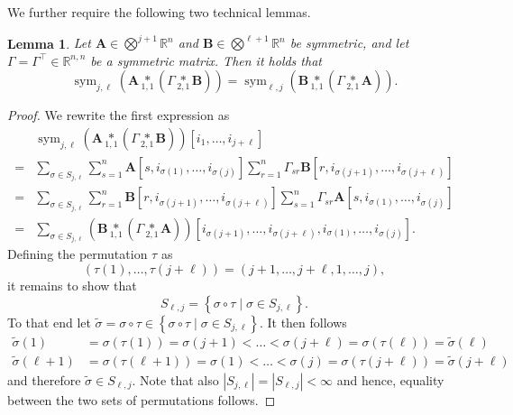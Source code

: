 \documentclass[11pt,reqno]{amsart}
\numberwithin{equation}{section}
\theoremstyle{plain}
\newtheorem{lemma}{Lemma}
\newcommand{\R}{\mathbb{R}}
\DeclareMathOperator{\Sym}{sym}
\newcommand{\tenp}[2]{\underset{#1,#2}{*}}
\begin{document}
We further require the following two technical lemmas. 
\begin{lemma}\label{LEM:HigherDerivativesCalculations}
  Let $\mathbf{A}\in \bigotimes^{j+1}\R^n$ and $\mathbf{B}\in \bigotimes^{\ell+1}\R^n$ be symmetric, and let $\Gamma=\Gamma^\top \in\R^{n,n}$ be a symmetric matrix. Then it holds that
      \begin{equation}\label{EQ:SymmetrieHJBValueFuncTerms}
        \Sym_{j,\ell}\left(\mathbf{A} \tenp{1}{1}\left(\Gamma\tenp{2}{1} \mathbf{B}\right)\right) = \Sym_{\ell,j}\left(\mathbf{B} \tenp{1}{1}\left(\Gamma\tenp{2}{1} \mathbf{A}\right)\right).
      \end{equation}
\end{lemma}
\begin{proof}
  We rewrite the first expression as
  \begin{align*}
    &\Sym_{j,\ell}\left(\mathbf{A} \tenp{1}{1}\left(\Gamma\tenp{2}{1} \mathbf{B}\right)\right)[i_1,\dots,i_{j+\ell}]\\ =& \sum_{\sigma\in S_{j,\ell}} \sum_{s=1}^{n} \mathbf{A}[s,i_{\sigma(1)},\dots,i_{\sigma(j)}] \sum_{r=1}^{n} \Gamma_{sr}\mathbf{B}[r,i_{\sigma(j+1)},\dots,i_{\sigma(j+\ell)}]\\
    =& \sum_{\sigma\in S_{j,\ell}} \sum_{r=1}^{n} \mathbf{B}[r,i_{\sigma(j+1)},\dots,i_{\sigma(j+\ell)}]  \sum_{s=1}^{n}  \Gamma_{sr} \mathbf{A}[s,i_{\sigma(1)},\dots,i_{\sigma(j)}] \\
    =& \sum_{\sigma\in S_{j,\ell}} \left( \mathbf{B} \tenp{1}{1} \left( \Gamma\tenp{2}{1} \mathbf{A} \right) \right)[i_{\sigma(j+1)},\dots,i_{\sigma(j+\ell)},i_{\sigma(1)},\dots,i_{\sigma(j)}].
  \end{align*}
  Defining the permutation $\tau$ as
  \[
    (\tau(1),\dots,\tau(j+\ell)) = (j+1,\dots,j+\ell,1,\dots,j),
  \]
  it remains to show that
  \[
    S_{\ell,j} = \left\{ \sigma\circ\tau \mid \sigma\in S_{j,\ell} \right\}.
  \]
  To that end let $\tilde{\sigma}=\sigma\circ\tau \in \left\{ \sigma\circ\tau \mid \sigma\in S_{j,\ell} \right\}$. It then follows
  \begin{align*}
    \tilde{\sigma}(1) &= \sigma(\tau(1)) = \sigma(j+1) < \dots < \sigma(j+\ell) =\sigma(\tau(\ell)) = \tilde{\sigma}(\ell) \\
    \tilde{\sigma}(\ell+1) &= \sigma(\tau(\ell+1)) = \sigma(1) < \dots < \sigma(j) =\sigma(\tau(j+\ell)) = \tilde{\sigma}(j+\ell)
  \end{align*}
  and therefore $\tilde{\sigma}\in S_{\ell,j}$. Note that also $|S_{j,\ell}|=|S_{\ell,j}|<\infty$ and hence, equality between the two sets of permutations follows.
\end{proof}
\end{document}
